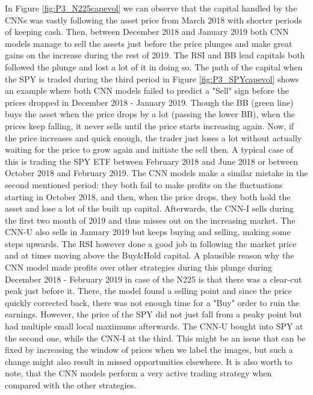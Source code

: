 \documentclass[12pt, a4paper]{article}
\begin{document}
In Figure \ref{fig:P3_N225capevol} we can observe that the capital handled by the CNNs was vastly following the asset price from March 2018 with shorter periods of keeping cash. Then, between December 2018 and January 2019 both CNN models manage to sell the assets just before the price plunges and make great gains on the increase during the rest of 2019. The RSI and BB lead capitals both followed the plunge and lost a lot of it in doing so. 
The path of the capital when the SPY is traded during the third period in Figure \ref{fig:P3_SPYcapevol} shows an example where both CNN models failed to predict a "Sell" sign before the prices dropped in December 2018 - January 2019. Though the BB (green line) buys the asset when the price drops by a lot (passing the lower BB), when the prices keep falling, it never sells until the price starts increasing again. Now, if the price increases and quick enough, the trader just loses a lot without actually waiting for the price to grow again and initiate the sell then. A typical case of this is trading the SPY ETF between February 2018 and June 2018 or between October 2018 and February 2019. 
The CNN models make a similar mistake in the second mentioned period: they both fail to make profits on the fluctuations starting in October 2018, and then, when the price drops, they both hold the asset and lose a lot of the built up capital. Afterwards, the CNN-I sells during the first two month of 2019 and thus misses out on the increasing market. The CNN-U also sells in January 2019 but keeps buying and selling, making some steps upwards. The RSI however done a good job in following the market price and at times moving above the Buy\&Hold capital. A plausible reason why the CNN model made profits over other strategies during this plunge during December 2018 - February 2019 in case of the N225 is that there was a clear-cut peak just before it. There, the model found a selling point and since the price quickly corrected back, there was not enough time for a "Buy" order to ruin the earnings. However, the price of the SPY did not just fall from a peaky point but had multiple small local maximums afterwards. The CNN-U bought into SPY at the second one, while the CNN-I at the third. This might be an issue that can be fixed by increasing the window of prices when we label the images, but such a change might also result in missed opportunities elsewhere. It is also worth to note, that the CNN models perform a very active trading strategy when compared with the other strategies.
\end{document}
